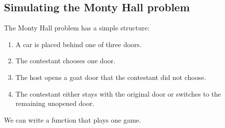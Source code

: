 \documentclass[
  letterpaper,
  DIV=11,
  numbers=noendperiod]{scrreprt}
\providecommand{\tightlist}{%
  \setlength{\itemsep}{0pt}\setlength{\parskip}{0pt}}
\begin{document}
\subsection{Simulating the Monty Hall
problem}\label{simulating-the-monty-hall-problem}

The Monty Hall problem has a simple structure:

\begin{enumerate}
\def\labelenumi{\arabic{enumi}.}
\tightlist
\item
  A car is placed behind one of three doors.
\item
  The contestant chooses one door.
\item
  The host opens a goat door that the contestant did not choose.
\item
  The contestant either stays with the original door or switches to the
  remaining unopened door.
\end{enumerate}

We can write a function that plays one game.
\end{document}
